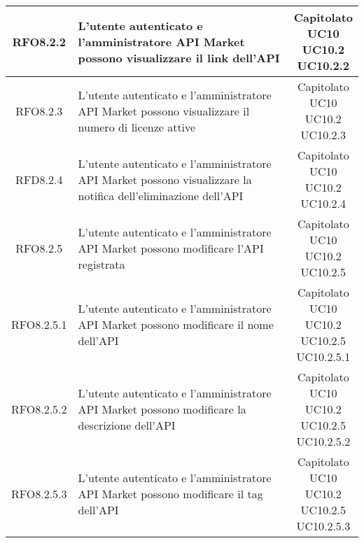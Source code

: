 \begin{longtable}{|c|p{8cm}|c|}
RFO8.2.2 &  L'utente autenticato e l'amministratore API Market possono visualizzare il link dell'API & \makecell*{Capitolato\\UC10\\UC10.2\\UC10.2.2} \\
\hline

RFO8.2.3 &  L'utente autenticato e l'amministratore API Market possono visualizzare il numero di licenze attive & \makecell*{Capitolato\\UC10\\UC10.2\\UC10.2.3} \\
\hline

RFD8.2.4 &  L'utente autenticato e l'amministratore API Market possono visualizzare la notifica dell'eliminazione dell'API & \makecell*{Capitolato\\UC10\\UC10.2\\UC10.2.4} \\
\hline

RFO8.2.5 &  L'utente autenticato e l'amministratore API Market possono modificare l'API registrata & \makecell*{Capitolato\\UC10\\UC10.2\\UC10.2.5} \\
\hline

RFO8.2.5.1 &  L'utente autenticato e l'amministratore API Market possono modificare il nome dell'API & \makecell*{Capitolato\\UC10\\UC10.2\\UC10.2.5\\UC10.2.5.1} \\
\hline

RFO8.2.5.2 &  L'utente autenticato e l'amministratore API Market possono modificare la descrizione dell'API & \makecell*{Capitolato\\UC10\\UC10.2\\UC10.2.5\\UC10.2.5.2} \\
\hline

RFO8.2.5.3 &  L'utente autenticato e l'amministratore API Market possono modificare il tag dell'API & \makecell*{Capitolato\\UC10\\UC10.2\\UC10.2.5\\UC10.2.5.3} \\
\hline


\end{longtable}

